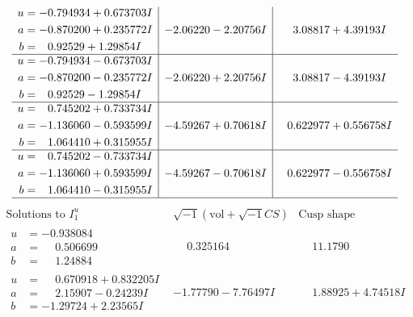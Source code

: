 \documentclass[1p]{elsarticle_modified}
\theoremstyle{definition}
\newcommand{\I}{\sqrt{-1}}
\begin{document}
$$\begin{array}{c|c|c}
\begin{aligned}
u &= -0.794934 + 0.673703 I \\
a &= -0.870200 + 0.235772 I \\
b &= \phantom{-}0.92529 + 1.29854 I\end{aligned}
 & -2.06220 - 2.20756 I & \phantom{-}3.08817 + 4.39193 I \\ \hline\begin{aligned}
u &= -0.794934 - 0.673703 I \\
a &= -0.870200 - 0.235772 I \\
b &= \phantom{-}0.92529 - 1.29854 I\end{aligned}
 & -2.06220 + 2.20756 I & \phantom{-}3.08817 - 4.39193 I \\ \hline\begin{aligned}
u &= \phantom{-}0.745202 + 0.733734 I \\
a &= -1.136060 - 0.593599 I \\
b &= \phantom{-}1.064410 + 0.315955 I\end{aligned}
 & -4.59267 + 0.70618 I & \phantom{-}0.622977 + 0.556758 I \\ \hline\begin{aligned}
u &= \phantom{-}0.745202 - 0.733734 I \\
a &= -1.136060 + 0.593599 I \\
b &= \phantom{-}1.064410 - 0.315955 I\end{aligned}
 & -4.59267 - 0.70618 I & \phantom{-}0.622977 - 0.556758 I\\
 \hline 
 \end{array}$$\newpage$$\begin{array}{c|c|c}  
\text{Solutions to }I^u_{1}& \I (\text{vol} + \sqrt{-1}CS) & \text{Cusp shape}\\
 \hline 
\begin{aligned}
u &= -0.938084\phantom{ +0.000000I} \\
a &= \phantom{-}0.506699\phantom{ +0.000000I} \\
b &= \phantom{-}1.24884\phantom{ +0.000000I}\end{aligned}
 & \phantom{-}0.325164\phantom{ +0.000000I} & \phantom{-}11.1790\phantom{ +0.000000I} \\ \hline\begin{aligned}
u &= \phantom{-}0.670918 + 0.832205 I \\
a &= \phantom{-}2.15907 - 0.24239 I \\
b &= -1.29724 + 2.23565 I\end{aligned}
 & -1.77790 - 7.76497 I & \phantom{-}1.88925 + 4.74518 I \\ \hline\begin{aligned}

\end{aligned}
\end{array}$$
\end{document}

